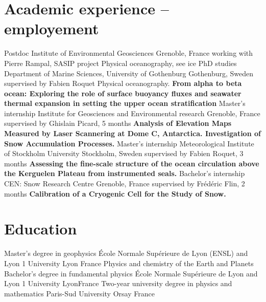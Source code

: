 \documentclass[11pt,a4paper,roman]{moderncv}
\begin{document}
\makecvtitle


\section{Academic experience -- employement}
        {Postdoc}
        {Institute of Environmental Geosciences}
        {Grenoble, France}
        {working with Pierre Rampal, SASIP project}
        {Physical oceanography, see ice}
        {PhD studies}
        {Department of Marine Sciences, University of Gothenburg}
        {Gothenburg, Sweden}
        {supervised by Fabien Roquet}
        {Physical oceanography.
          \textbf{From alpha to beta ocean: Exploring the role of surface buoyancy fluxes and seawater thermal expansion in setting the upper ocean stratification}
        }
        {Master's internship}
        {Institute for Geosciences and Environmental research}
        {Grenoble, France}
        {supervised by Ghislain Picard, 5 months}
        {\textbf{Analysis of Elevation Maps Measured by Laser Scannering at
            Dome C, Antarctica. Investigation of Snow Accumulation Processes.}}
        {Master's internship}
        {Meteorological Institute of Stockholm University}
        {Stockholm, Sweden}
        {supervised by Fabien Roquet, 3 months}
        {\textbf{Assessing the fine-scale structure of the ocean
            circulation above the Kerguelen Plateau from instrumented seals.}}
        {Bachelor's internship}
        {CEN: Snow Research Centre}
        {Grenoble, France}
        {supervised by Frédéric Flin, 2 months}
        {\textbf{Calibration of a Cryogenic Cell for the Study of Snow.}}



\section{Education}
        {Master's degree in geophysics}
        {École Normale Supérieure de Lyon (ENSL) and Lyon 1 University}
        {Lyon}
        {France}
        {Physics and chemistry of the Earth and Planets}
        {Bachelor's degree in fundamental physics}
        {École Normale Supérieure de Lyon and Lyon 1 University}
        {Lyon}{France}{}
        {Two-year university degree in physics and mathematics}
        {Paris-Sud University}
        {Orsay}
        {France}
        {}
\end{document}
